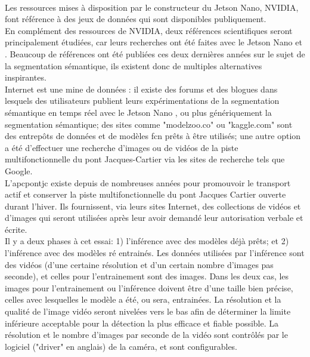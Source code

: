 ﻿\label{metho:data}
\vspace{\baselineskip}
\\
Les ressources mises à disposition par le constructeur du Jetson Nano, NVIDIA, font référence à des jeux de données qui sont disponibles publiquement.
\vspace{\baselineskip}
\\
\noindent En complément des ressources de NVIDIA, deux références scientifiques seront principalement étudiées, car leurs recherches ont été faites avec le Jetson Nano \parencite{nguyen_mavnet_2019} et \parencite{chong_real-time_1992}. Beaucoup de références ont été publiées ces deux dernières années sur le sujet de la segmentation sémantique, ils existent donc de multiples alternatives inspirantes.
\vspace{\baselineskip}
\\
\noindent Internet est une mine de données : il existe des forums et des blogues dans lesquels des utilisateurs publient leurs expérimentations de la segmentation sémantique en temps réel avec le Jetson Nano \parencite{dustin_realtime_2019}, ou plus génériquement la segmentation sémantique; des sites comme "modelzoo.co" ou "kaggle.com" sont des entrepôts de données et de modèles \acrshort{fcn} prêts à être utilisés; une autre option a été d'effectuer une recherche d'images ou de vidéos de la piste multifonctionnelle du pont Jacques-Cartier via les sites de recherche tels que Google. 
\vspace{\baselineskip}
\\
\noindent L'\acrlong{apcpontjc} existe depuis de nombreuses années pour promouvoir le transport actif et conserver la piste multifonctionnelle du pont Jacques Cartier ouverte durant l'hiver. Ils fournissent, via leurs sites Internet, des collections de vidéos et d'images qui seront utilisées après leur avoir demandé leur autorisation verbale et écrite. \parencite{association_des_pietons_et_cyclistes_du_pont_jacques-cartier_pontjacques-cartier365com_2020} \parencite{association_des_pietons_et_cyclistes_pont_jacques-cartier_flickr_2020}
\vspace{\baselineskip}
\\
Il y a deux phases à cet essai: 1) l'inférence avec des modèles déjà prêts; et 2) l'inférence avec des modèles ré entrainés. Les données utilisées par l'inférence sont des vidéos (d'une certaine résolution et d'un certain nombre d'images pas seconde), et celles pour l'entrainement sont des images. Dans les deux cas, les images pour l'entrainement ou l'inférence doivent être d'une taille bien précise, celles avec lesquelles le modèle a été, ou sera, entrainées. La résolution et la qualité de l'image vidéo seront nivelées vers le bas afin de déterminer la limite inférieure acceptable pour la détection la plus efficace et fiable possible. La résolution et le nombre d'images par seconde de la vidéo sont contrôlés par le logiciel ("driver" en anglais) de la caméra, et sont configurables. 
